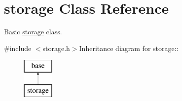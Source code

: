 \hypertarget{classstorage}{
\section{storage Class Reference}
\label{classstorage}
}


Basic \hyperlink{classstorage}{storage} class.  


{\ttfamily \#include $<$storage.h$>$}Inheritance diagram for storage::\begin{figure}[H]
\begin{center}
\leavevmode
\includegraphics[height=2cm]{classstorage}
\end{center}
\end{figure}
